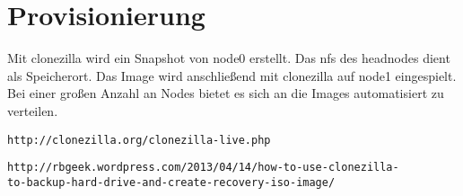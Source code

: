 \chapter{Provisionierung}
Mit clonezilla wird ein Snapshot von node0 erstellt. Das nfs des headnodes dient als Speicherort.
Das Image wird anschließend mit clonezilla auf node1 eingespielt.\\
Bei einer großen Anzahl an Nodes bietet es sich an die Images automatisiert zu verteilen.
\begin{lstlisting}[style=bash]
http://clonezilla.org/clonezilla-live.php
\end{lstlisting}
\begin{lstlisting}[style=bash]
http://rbgeek.wordpress.com/2013/04/14/how-to-use-clonezilla-
to-backup-hard-drive-and-create-recovery-iso-image/
\end{lstlisting}

